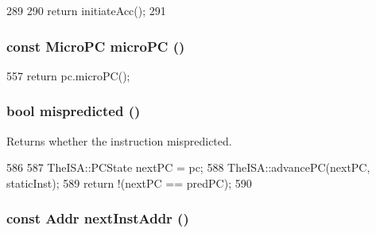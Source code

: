 \begin{DoxyCode}
289 {
290     return initiateAcc();
291 }
\end{DoxyCode}
\hypertarget{classInOrderDynInst_aad0e6437d7a3cc30272bc0aec78db64a}{
\subsubsection[{microPC}]{\setlength{\rightskip}{0pt plus 5cm}const {\bf MicroPC} microPC ()}}
\label{classInOrderDynInst_aad0e6437d7a3cc30272bc0aec78db64a}



\begin{DoxyCode}
557 { return pc.microPC(); }
\end{DoxyCode}
\hypertarget{classInOrderDynInst_a821a18b4aa4e70533b1df605037062cd}{
\subsubsection[{mispredicted}]{\setlength{\rightskip}{0pt plus 5cm}bool mispredicted ()}}
\label{classInOrderDynInst_a821a18b4aa4e70533b1df605037062cd}
Returns whether the instruction mispredicted. 


\begin{DoxyCode}
586     {
587         TheISA::PCState nextPC = pc;
588         TheISA::advancePC(nextPC, staticInst);
589         return !(nextPC == predPC);
590     }
\end{DoxyCode}
\hypertarget{classInOrderDynInst_a693483ad639fbfcedc7ee157b2ef0e81}{
\subsubsection[{nextInstAddr}]{\setlength{\rightskip}{0pt plus 5cm}const {\bf Addr} nextInstAddr ()}}
\label{classInOrderDynInst_a693483ad639fbfcedc7ee157b2ef0e81}



